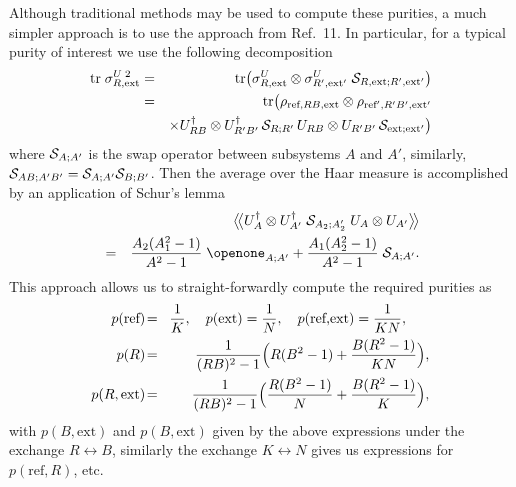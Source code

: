 \documentclass[aps,12pt]{revtex4}
\begin{document}
Although traditional methods \cite{ap2} may be used to compute these
purities, a much simpler approach is to use the approach from
Ref.~11. In particular, for a typical purity of interest
we use the following decomposition
\begin{eqnarray}
\text{tr}\; \sigma_{R,\text{ext}}^{U\;2}
&=& \text{tr} \bigl( \sigma_{R,\text{ext}}^U
\otimes \sigma_{R',\text{ext}'}^U \;
{\cal S}_{R,\text{ext};R',\text{ext}'}\bigr)\\
&=& \text{tr} \bigl( \rho_{\text{ref},RB,\text{ext}}\otimes
\rho_{\text{ref}',R'B',\text{ext}'}\nonumber\\
&&\times U_{RB}^\dagger\otimes U_{R'B'}^\dagger\,
{\cal S}_{R;R'}\, U_{RB}\otimes U_{R'B'}\,
{\cal S}_{\text{ext};\text{ext}'} \bigr) \nonumber
\end{eqnarray}
where ${\cal S}_{A;A'}$ is the swap operator between 
subsystems $A$ and $A'$, similarly,
${\cal S}_{AB;A'B'}={\cal S}_{A;A'}{\cal S}_{B;B'}$. Then the average
over the Haar measure is accomplished by an application of Schur's
lemma \cite{Abey06}
\begin{eqnarray}
&&\bigl\langle\!\bigl\langle U_A^\dagger\otimes U_{A'}^\dagger\;
{\cal S}_{A_2;A_2'}\; U_A \otimes U_{A'}\bigr\rangle\!\bigr\rangle
\nonumber \\
&=&\frac{A_2(A_1^2-1)}{A^2-1}\;\openone_{A;A'}
+\frac{A_1(A_2^2-1)}{A^2-1}\;{\cal S}_{A;A'}.
\end{eqnarray}
This approach allows us to straight-forwardly compute the required
purities as
\begin{eqnarray}
p(\text{ref})\!&=&\!\frac{1}{K},\quad
p(\text{ext})=\frac{1}{N},\quad
p(\text{ref,ext})=\frac{1}{KN},~~~~~ \nonumber \\
p(R)\!&=&\!\frac{1}{(RB)^2-1}
\Bigl( R(B^2-1)+\frac{B(R^2-1)}{KN}\Bigr), \label{HJS} \\ %
p(R,\text{ext})\!&=&\!\frac{1}{(RB)^2-1}
\Bigl( \frac{R(B^2-1)}{N}+\frac{B(R^2-1)}{K}\Bigr), \nonumber
\end{eqnarray}
with $p(B,\text{ext})$ and $p(B,\text{ext})$ given by the
above expressions under the exchange $R\leftrightarrow B$, similarly
the exchange $K\leftrightarrow N$ gives us expressions for
$p(\text{ref},R)$, etc.
\end{document}
